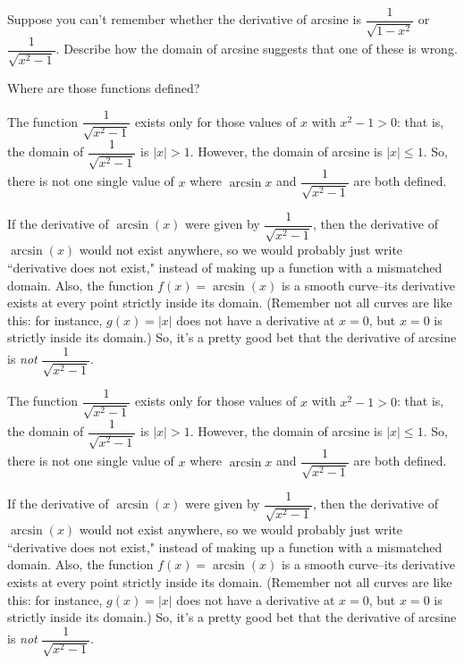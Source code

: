 \begin{Mquestion}
Suppose you can't remember whether the derivative of arcsine is $\dfrac{1}{\sqrt{1-x^2}}$ or $\dfrac{1}{\sqrt{x^2-1}}$. Describe how the domain of arcsine suggests that one of these is wrong.
\end{Mquestion}
\begin{hint}
Where are those functions defined?
\end{hint}
\begin{answer}
The function $\dfrac{1}{\sqrt{x^2-1}}$ exists only for those values of $x$ with $x^2-1>0$: that is, the domain of $\dfrac{1}{\sqrt{x^2-1}}$ is $|x|>1$. However, the domain of arcsine is $|x| \leq 1$. So, there is not one single value of $x$ where  $\arcsin x$ and $\dfrac{1}{\sqrt{x^2-1}}$ are both defined.

If the derivative of $\arcsin(x)$ were given by $\dfrac{1}{\sqrt{x^2-1}}$, then the derivative of $\arcsin(x)$ would not exist anywhere, so we would probably just write ``derivative does not exist," instead of making up a function with a mismatched domain. Also, the function $f(x)=\arcsin(x)$ is a smooth curve--its derivative exists at every point strictly inside its domain. (Remember not all curves are like this: for instance, $g(x)=|x|$ does not have a derivative at $x=0$, but $x=0$ is strictly inside its domain.) So, it's a pretty good bet that the derivative of arcsine is \emph{not} $\dfrac{1}{\sqrt{x^2-1}}$.
\end{answer}
\begin{solution}
The function $\dfrac{1}{\sqrt{x^2-1}}$ exists only for those values of $x$ with $x^2-1>0$: that is, the domain of $\dfrac{1}{\sqrt{x^2-1}}$ is $|x|>1$. However, the domain of arcsine is $|x| \leq 1$. So, there is not one single value of $x$ where  $\arcsin x$ and $\dfrac{1}{\sqrt{x^2-1}}$ are both defined.

If the derivative of $\arcsin(x)$ were given by $\dfrac{1}{\sqrt{x^2-1}}$, then the derivative of $\arcsin(x)$ would not exist anywhere, so we would probably just write ``derivative does not exist," instead of making up a function with a mismatched domain. Also, the function $f(x)=\arcsin(x)$ is a smooth curve--its derivative exists at every point strictly inside its domain. (Remember not all curves are like this: for instance, $g(x)=|x|$ does not have a derivative at $x=0$, but $x=0$ is strictly inside its domain.) So, it's a pretty good bet that the derivative of arcsine is \emph{not} $\dfrac{1}{\sqrt{x^2-1}}$.
\end{solution}




